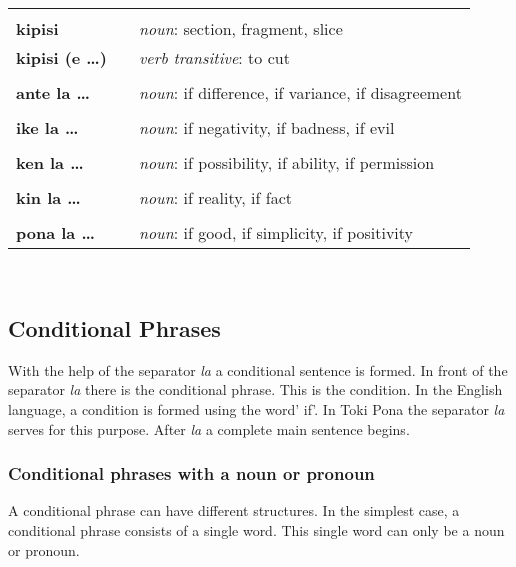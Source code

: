 \begin{supertabular}{p{2,5cm}|ll}
 && \\ %
\textbf{kipisi } && \textit{noun}: section, fragment, slice \\ %
\textbf{kipisi (e \dots)} && \textit{verb transitive}: to cut \\ %
 && \\ %
 \textbf{ante la \dots} && \textit{noun}: if difference, if variance, if disagreement  \\ %
 && \\ %
\textbf{ike la \dots} && \textit{noun}: if negativity, if badness, if evil \\ %
 && \\ %
\textbf{ken la \dots} && \textit{noun}: if possibility, if ability, if permission \\ %
 && \\ %
\textbf{kin la \dots} && \textit{noun}: if reality, if fact \\  %
 && \\ %
\textbf{pona la \dots} && \textit{noun}: if good, if simplicity, if positivity \\ %
\end{supertabular} \\
%
\subsection*{Conditional Phrases}
%
With the help of the separator \textit{la} a conditional sentence is formed.
In front of the separator \textit{la} there is the conditional phrase. 
This is the condition. 
In the English language, a condition is formed using the word' if'.
In Toki Pona the separator \textit{la} serves for this purpose. 
After \textit{la} a complete main sentence begins.

\newpage
{}
\subsubsection*{Conditional phrases with a noun or pronoun}
%
A conditional phrase can have different structures. 
In the simplest case, a conditional phrase consists of a single word. 
This single word can only be a noun or pronoun. 

